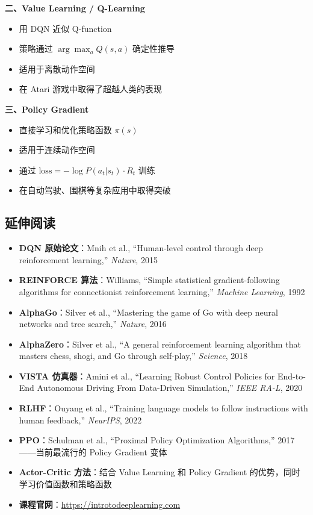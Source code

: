 \documentclass[a4paper]{article}
\begin{document}
\textbf{二、Value Learning / Q-Learning}
\begin{itemize}
    \item 用 DQN 近似 Q-function
    \item 策略通过 $\arg\max_a Q(s,a)$ 确定性推导
    \item 适用于离散动作空间
    \item 在 Atari 游戏中取得了超越人类的表现
\end{itemize}

\textbf{三、Policy Gradient}
\begin{itemize}
    \item 直接学习和优化策略函数 $\pi(s)$
    \item 适用于连续动作空间
    \item 通过 $\text{loss} = -\log P(a_t|s_t) \cdot R_t$ 训练
    \item 在自动驾驶、围棋等复杂应用中取得突破
\end{itemize}

\subsection{延伸阅读}

\begin{itemize}
    \item \textbf{DQN 原始论文}：Mnih et al., ``Human-level control through deep reinforcement learning,'' \textit{Nature}, 2015
    \item \textbf{REINFORCE 算法}：Williams, ``Simple statistical gradient-following algorithms for connectionist reinforcement learning,'' \textit{Machine Learning}, 1992
    \item \textbf{AlphaGo}：Silver et al., ``Mastering the game of Go with deep neural networks and tree search,'' \textit{Nature}, 2016
    \item \textbf{AlphaZero}：Silver et al., ``A general reinforcement learning algorithm that masters chess, shogi, and Go through self-play,'' \textit{Science}, 2018
    \item \textbf{VISTA 仿真器}：Amini et al., ``Learning Robust Control Policies for End-to-End Autonomous Driving From Data-Driven Simulation,'' \textit{IEEE RA-L}, 2020
    \item \textbf{RLHF}：Ouyang et al., ``Training language models to follow instructions with human feedback,'' \textit{NeurIPS}, 2022
    \item \textbf{PPO}：Schulman et al., ``Proximal Policy Optimization Algorithms,'' 2017------当前最流行的 Policy Gradient 变体
    \item \textbf{Actor-Critic 方法}：结合 Value Learning 和 Policy Gradient 的优势，同时学习价值函数和策略函数
    \item \textbf{课程官网}：\url{https://introtodeeplearning.com}
\end{itemize}
\end{document}
